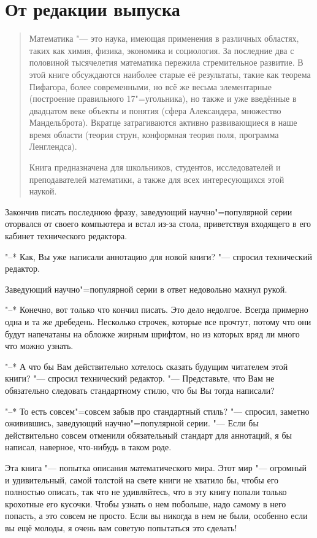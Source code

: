 \chapter*{От редакции выпуска}

\begin{quotation}
Математика "--- это наука, имеющая применения в различных областях, таких как
химия, физика, экономика и социология.
За последние два с половиной тысячелетия математика пережила стремительное
развитие.
В этой книге обсуждаются наиболее старые её результаты, такие как теорема
Пифагора, более современными, но всё же весьма элементарные (построение
правильного 17"=угольника), но также и уже введённые в двадцатом веке объекты и
понятия (сфера Александера, множество Мандельброта).
Вкратце затрагиваются активно развивающиеся в наше время области (теория струн,
конформная теория поля, программа Ленглендса).

Книга предназначена для школьников, студентов, исследователей и преподавателей
математики, а также для всех интересующихся этой наукой.
\end{quotation}

Закончив писать последнюю фразу, заведующий научно"=популярной серии оторвался
от своего компьютера и встал из-за стола, приветствуя входящего в его кабинет
технического редактора.

"--* Как, Вы уже написали аннотацию для новой книги? "--- спросил технический
редактор.

Заведующий научно"=популярной серии в ответ недовольно махнул рукой.

"--* Конечно, вот только что кончил писать.
Это дело недолгое.
Всегда примерно одна и та же дребедень.
Несколько строчек, которые все прочтут, потому что они будут напечатаны на
обложке жирным шрифтом, но из которых вряд ли много что можно узнать.

"--* А что бы Вам действительно хотелось сказать будущим читателем этой книги?
"--- спросил технический редактор.
"--- Представьте, что Вам не обязательно следовать стандартному стилю, что бы Вы
тогда написали?

"--* То есть совсем"=совсем забыв про стандартный стиль? "--- спросил, заметно
оживившись, заведующий научно"=популярной серии.
"--- Если бы действительно совсем отменили обязательный стандарт для аннотаций,
я бы написал, наверное, что-нибудь в таком роде.

\medskip
Эта книга "--- попытка описания математического мира.
Этот мир "--- огромный и удивительный, самой толстой на свете книги не хватило
бы, чтобы его полностью описать, так что не удивляйтесь, что в эту книгу попали
только крохотные его кусочки.
Чтобы узнать о нем побольше, надо самому в него попасть, а это совсем не просто.
Если вы никогда в нем не были, особенно если вы ещё молоды, я очень вам советую
попытаться это сделать!

